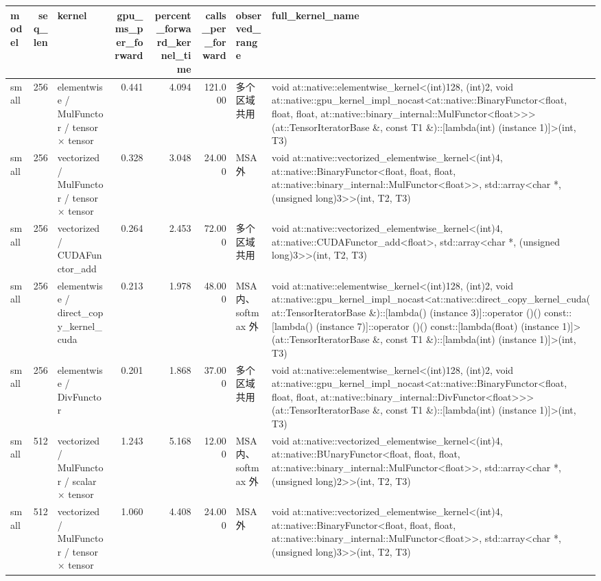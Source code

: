 \begin{tabular}{lrlrrrll}
\toprule
model & seq\_len & kernel & gpu\_ms\_per\_forward & percent\_forward\_kernel\_time & calls\_per\_forward & observed\_range & full\_kernel\_name \\
\midrule
small & 256 & elementwise / MulFunctor / tensor × tensor & 0.441 & 4.094 & 121.000 & 多个区域共用 & void at::native::elementwise\_kernel<(int)128, (int)2, void at::native::gpu\_kernel\_impl\_nocast<at::native::BinaryFunctor<float, float, float, at::native::binary\_internal::MulFunctor<float>>>(at::TensorIteratorBase \&, const T1 \&)::[lambda(int) (instance 1)]>(int, T3) \\
small & 256 & vectorized / MulFunctor / tensor × tensor & 0.328 & 3.048 & 24.000 & MSA 外 & void at::native::vectorized\_elementwise\_kernel<(int)4, at::native::BinaryFunctor<float, float, float, at::native::binary\_internal::MulFunctor<float>>, std::array<char *, (unsigned long)3>>(int, T2, T3) \\
small & 256 & vectorized / CUDAFunctor\_add & 0.264 & 2.453 & 72.000 & 多个区域共用 & void at::native::vectorized\_elementwise\_kernel<(int)4, at::native::CUDAFunctor\_add<float>, std::array<char *, (unsigned long)3>>(int, T2, T3) \\
small & 256 & elementwise / direct\_copy\_kernel\_cuda & 0.213 & 1.978 & 48.000 & MSA 内、softmax 外 & void at::native::elementwise\_kernel<(int)128, (int)2, void at::native::gpu\_kernel\_impl\_nocast<at::native::direct\_copy\_kernel\_cuda(at::TensorIteratorBase \&)::[lambda() (instance 3)]::operator ()() const::[lambda() (instance 7)]::operator ()() const::[lambda(float) (instance 1)]>(at::TensorIteratorBase \&, const T1 \&)::[lambda(int) (instance 1)]>(int, T3) \\
small & 256 & elementwise / DivFunctor & 0.201 & 1.868 & 37.000 & 多个区域共用 & void at::native::elementwise\_kernel<(int)128, (int)2, void at::native::gpu\_kernel\_impl\_nocast<at::native::BinaryFunctor<float, float, float, at::native::binary\_internal::DivFunctor<float>>>(at::TensorIteratorBase \&, const T1 \&)::[lambda(int) (instance 1)]>(int, T3) \\
small & 512 & vectorized / MulFunctor / scalar × tensor & 1.243 & 5.168 & 12.000 & MSA 内、softmax 外 & void at::native::vectorized\_elementwise\_kernel<(int)4, at::native::BUnaryFunctor<float, float, float, at::native::binary\_internal::MulFunctor<float>>, std::array<char *, (unsigned long)2>>(int, T2, T3) \\
small & 512 & vectorized / MulFunctor / tensor × tensor & 1.060 & 4.408 & 24.000 & MSA 外 & void at::native::vectorized\_elementwise\_kernel<(int)4, at::native::BinaryFunctor<float, float, float, at::native::binary\_internal::MulFunctor<float>>, std::array<char *, (unsigned long)3>>(int, T2, T3) \\

\end{tabular}
